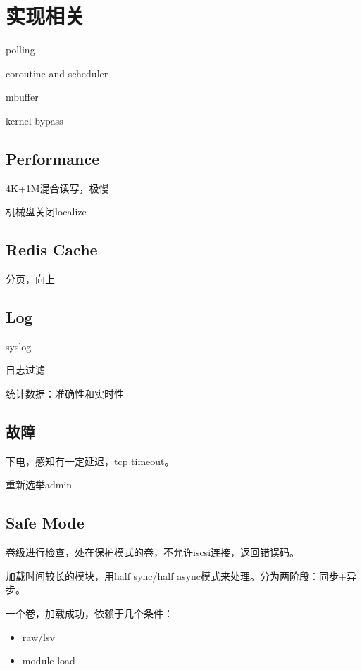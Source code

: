 \chapter{实现相关}

\begin{compactitem}
    \item polling 
    \item coroutine and scheduler
    \item mbuffer
    \item kernel bypass
\end{compactitem}

\section{Performance}

4K+1M混合读写，极慢

机械盘关闭localize

\section{Redis Cache}

分页，向上

\section{Log}

syslog

日志过滤

统计数据：准确性和实时性

\section{故障}

下电，感知有一定延迟，tcp timeout。

重新选举admin

\section{Safe Mode}

卷级进行检查，处在保护模式的卷，不允许iscsi连接，返回错误码。

加载时间较长的模块，用half sync/half async模式来处理。分为两阶段：同步+异步。

一个卷，加载成功，依赖于几个条件：
\begin{itemize}
    \item raw/lsv
    \item module load
\end{itemize}

